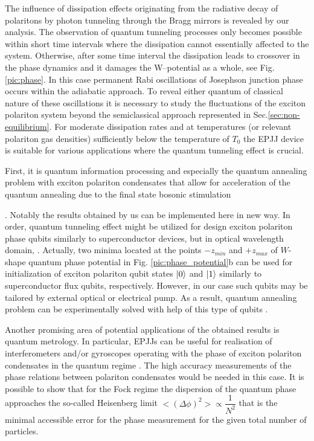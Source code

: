 \documentclass[aps, pre, preprint, groupedaddress, superscriptaddress, showkeys, showpacs] {revtex4-1}
\DeclarePairedDelimiter\ket{\lvert}{\rangle}
\begin{document}
{{{The influence of dissipation effects originating from the radiative decay of polaritons by photon tunneling through the Bragg mirrors is revealed by our analysis.
The observation of quantum tunneling processes only becomes possible within short time intervals where the dissipation cannot essentially affected to the system.
Otherwise, after some time interval the dissipation leads to crossover in the phase dynamics and it damages the W--potential as a whole, see Fig. \ref{pic:phase}.
In this case permanent Rabi  oscillations of Josephson junction phase occurs within the adiabatic approach.
To reveal either quantum of classical nature of these oscillations it is necessary to study the fluctuations of the exciton polariton system beyond the semiclassical approach represented in Sec.\ref{sec:non-equilibrium}}. 
For moderate dissipation rates and at temperatures (or relevant polariton gas densities) sufficiently below the temperature of $T_{0}$ the EPJJ device is suitable for various applications where the quantum tunneling effect is crucial. 

First, it is quantum information processing and especially the quantum annealing problem  with exciton polariton condensates that allow for acceleration of the quantum annealing due to the final state bosonic stimulation {\cite{Yan}.
Notably the results obtained by us can be implemented here in new way.
In order, quantum tunneling effect might be utilized for design exciton polariton phase qubits similarly to superconductor devices, but in optical wavelength domain, \cite{Makhlin}.
Actually, two minima located at the points $-z_{min}$ and $+z_{max}$ of $W$-shape quantum phase potential in Fig. \ref{pic:phase_potential}b can be used for initialization of exciton polariton qubit states $\ket{0}$ and $\ket{1}$ similarly to superconductor flux qubits, respectively.
However, in our case such qubits may be tailored by external optical or electrical pump.
As a result, quantum annealing problem can be experimentally solved with help of this type of qubits \cite{Johnson}.  
 
Another promising area of potential applications of the obtained results is quantum metrology.
In particular, EPJJs can be useful for realisation of interferometers and/or gyroscopes operating with the phase of  exciton polariton condensates in the quantum regime \cite{Pezze, Gulevich}.
The high accuracy measurements of the phase relations between polariton condensates would be needed in this case.
It is possible to show that for the Fock regime the dispersion of the quantum phase approaches the so-called Heisenberg limit ${<(\Delta\phi)^2> \propto \dfrac{1}{N^2}}$ that is the minimal accessible error for the phase measurement for the given total number of particles.

}}}
\end{document}
